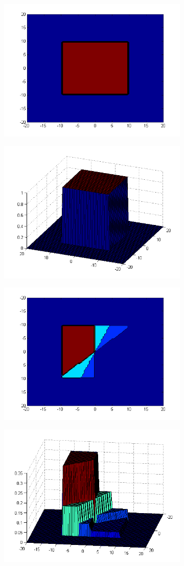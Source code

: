 \begin{figure}
\centering
\begin{subfigure}{.45\textwidth}
  \centering
  \includegraphics[width=.5\textwidth]{pic/prior2d.png}
  \caption{}
  \label{fig:prior2d}
\end{subfigure}%
\begin{subfigure}{.45\textwidth}
  \centering
  \includegraphics[width=.5\textwidth]{pic/prior3d.png}
  \caption{}
  \label{fig:prior3d}
\end{subfigure}
\begin{subfigure}{.45\textwidth}
  \centering
  \includegraphics[width=.5\textwidth]{pic/posterior2d.png}
  \caption{}
  \label{fig:posterior2d}
\end{subfigure}%
\begin{subfigure}{.45\textwidth}
  \centering
  \includegraphics[width=.5\textwidth]{pic/posterior3d.png}

\end{subfigure}
\end{figure}
